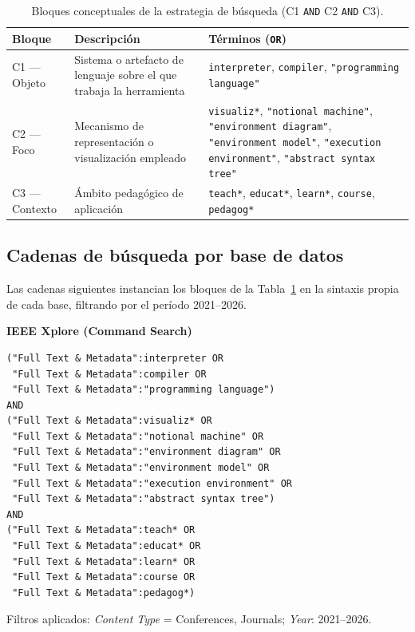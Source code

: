 \begin{table}[H]
\centering
\footnotesize
\begin{tabular}{|>{\raggedright\arraybackslash}p{2.6cm}|>{\raggedright\arraybackslash}p{4.3cm}|>{\raggedright\arraybackslash}p{6.3cm}|}
\hline
\textbf{Bloque} & \textbf{Descripción} & \textbf{Términos (\texttt{OR})} \\
\hline
C1 --- Objeto &
  Sistema o artefacto de lenguaje sobre el que trabaja la herramienta &
  \texttt{interpreter}, \texttt{compiler}, \texttt{"programming language"} \\
\hline
C2 --- Foco &
  Mecanismo de representación o visualización empleado &
  \texttt{visualiz*}, \texttt{"notional machine"}, \texttt{"environment diagram"}, \texttt{"environment model"}, \texttt{"execution environment"}, \texttt{"abstract syntax tree"} \\
\hline
C3 --- Contexto &
  Ámbito pedagógico de aplicación &
  \texttt{teach*}, \texttt{educat*}, \texttt{learn*}, \texttt{course}, \texttt{pedagog*} \\
\hline
\end{tabular}
\caption{Bloques conceptuales de la estrategia de búsqueda (C1 \texttt{AND} C2 \texttt{AND} C3).}
\label{tab:conceptos-busqueda}
\end{table}

\subsection{Cadenas de búsqueda por base de datos}

Las cadenas siguientes instancian los bloques de la Tabla~\ref{tab:conceptos-busqueda} en la sintaxis propia de cada base, filtrando por el período 2021--2026.

\noindent\textbf{IEEE Xplore (Command Search)}

\begin{lstlisting}
("Full Text & Metadata":interpreter OR
 "Full Text & Metadata":compiler OR
 "Full Text & Metadata":"programming language")
AND
("Full Text & Metadata":visualiz* OR
 "Full Text & Metadata":"notional machine" OR
 "Full Text & Metadata":"environment diagram" OR
 "Full Text & Metadata":"environment model" OR
 "Full Text & Metadata":"execution environment" OR
 "Full Text & Metadata":"abstract syntax tree")
AND
("Full Text & Metadata":teach* OR
 "Full Text & Metadata":educat* OR
 "Full Text & Metadata":learn* OR
 "Full Text & Metadata":course OR
 "Full Text & Metadata":pedagog*)
\end{lstlisting}
Filtros aplicados: \emph{Content Type} = Conferences, Journals; \emph{Year}: 2021--2026.

